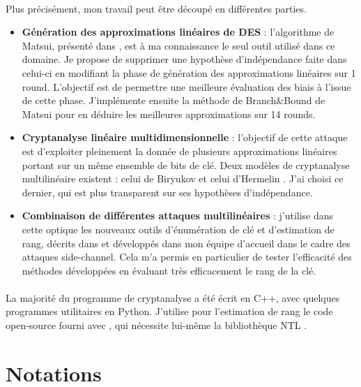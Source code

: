 \documentclass{scrartcl}
\begin{document}
\paragraph*{}
Plus précisément, mon travail peut être découpé en différentes parties.

\begin{itemize}
	\item \textbf{Génération des approximations linéaires de DES} : l'algorithme de Matsui, présenté dans \cite{Matsui1995}, est à
	ma connaissance le seul outil utilisé dans ce domaine. Je propose de supprimer une hypothèse d'indépendance faite dans
	celui-ci en modifiant la phase de génération des approximations linéaires sur 1 round. L'objectif est de permettre
	une meilleure évaluation des biais à l'issue de cette phase. J'implémente ensuite la méthode de Branch\&Bound de Matsui
	pour en déduire les meilleures approximations sur 14 rounds.
	\item \textbf{Cryptanalyse linéaire multidimensionnelle} : l'objectif de cette attaque est d'exploiter pleinement la donnée de
	plusieurs approximations linéaires portant sur un même ensemble de bits de clé. Deux modèles de cryptanalyse multilinéaire
	existent : celui de Biryukov \cite{Biryukov2004} et celui d'Hermelin \cite{TheseHermelin}. J'ai choisi ce dernier, qui
	est plus transparent sur ses hypothèses d'indépendance.
	\item \textbf{Combinaison de différentes attaques multilinéaires} : j'utilise dans cette optique les nouveaux outils
	d'énumération de clé et d'estimation de rang, décrits dans \cite{ches-2016} et développés dans mon équipe d'accueil dans le cadre
	des attaques side-channel. Cela m'a permis en particulier de tester l'efficacité des méthodes développées en évaluant
	très efficacement le rang de la clé.
\end{itemize}

\paragraph*{}
La majorité du programme de cryptanalyse \cite{github} a été écrit en C++, avec quelques programmes utilitaires en Python. J'utilise  pour
l'estimation de rang le code open-source fourni avec \cite{ches-2016}, qui nécessite lui-même la bibliothèque NTL \cite{ntl}.

\section{Notations}
\end{document}
